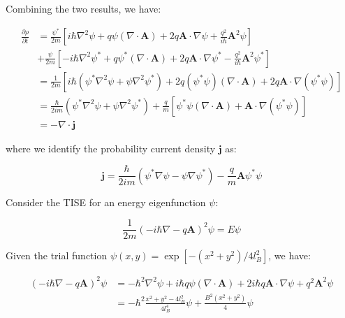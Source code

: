 \documentclass[12pt]{article}
\begin{document}
Combining the two results, we have:

\begin{equation}
    \begin{split}
        \frac{\partial \rho}{\partial t} &= \frac{\psi^{*}}{2m} \left[ i\hbar \nabla^{2} \psi + q \psi (\nabla \cdot \mathbf{A}) + 2q \mathbf{A} \cdot \nabla \psi + \frac{q^{2}}{i\hbar} \mathbf{A}^{2} \psi \right] \\
        &+ \frac{\psi}{2m} \left[ -i\hbar \nabla^{2} \psi^{*} + q \psi^{*} (\nabla \cdot \mathbf{A}) + 2q \mathbf{A} \cdot \nabla \psi^{*} - \frac{q^{2}}{i\hbar} \mathbf{A}^{2} \psi^{*} \right] \\
        &= \frac{1}{2m} \left[ i\hbar \left( \psi^{*} \nabla^{2} \psi + \psi \nabla^{2} \psi^{*} \right) + 2q \left( \psi^{*}\psi \right) (\nabla \cdot \mathbf{A}) + 2q \mathbf{A} \cdot \nabla \left( \psi^{*}\psi \right) \right] \\
        &= \frac{\hbar}{2im} \left( \psi^{*} \nabla^{2} \psi + \psi \nabla^{2} \psi^{*} \right) + \frac{q}{m} \left[ \psi^{*}\psi (\nabla \cdot \mathbf{A}) + \mathbf{A} \cdot \nabla \left( \psi^{*}\psi \right) \right] \\
        &= -\nabla \cdot \mathbf{j}
    \end{split}
\end{equation}

where we identify the probability current density $\mathbf{j}$ as:

\begin{equation}
    \mathbf{j} = \frac{\hbar}{2im} \left( \psi^{*} \nabla \psi - \psi \nabla \psi^{*} \right) - \frac{q}{m} \mathbf{A} \psi^{*}\psi
\end{equation}

Consider the TISE for an energy eigenfunction $\psi$:

\begin{equation}
    \frac{1}{2m} \left( -i\hbar \nabla - q\mathbf{A} \right)^{2} \psi = E\psi
\end{equation}

Given the trial function $\psi(x, y) = \exp [-(x^{2} + y^{2})/4l_{B}^{2}]$, we have:

\begin{equation}
    \begin{split}
        \left( -i\hbar \nabla - q\mathbf{A} \right)^{2} \psi &= -\hbar^{2} \nabla^{2} \psi + i\hbar q \psi \left( \nabla \cdot \mathbf{A} \right) + 2i\hbar q \mathbf{A} \cdot \nabla \psi + q^{2} \mathbf{A}^{2} \psi \\
        &= -\hbar^{2} \frac{x^{2} + y^{2} - 4l_{B}^{2}}{4l_{B}^{4}} \psi + \frac{B^{2}(x^{2} + y^{2})}{4} \psi
    \end{split}
\end{equation}
\end{document}
